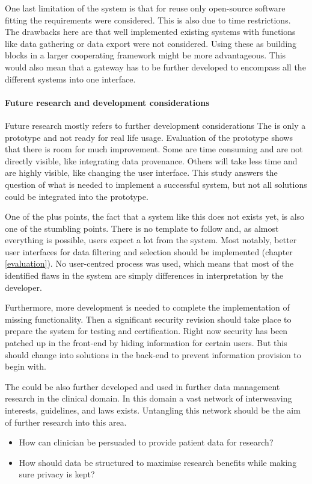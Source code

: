 One last limitation of the system is that for reuse only open-source software fitting the requirements were considered.
This is also due to time restrictions.
The drawbacks here are that well implemented existing systems with functions like data gathering or data export were not considered.
Using these as building blocks in a larger cooperating framework might be more advantageous.
This would also mean that a gateway has to be further developed to encompass all the different systems into one interface.

\paragraph{Future research and development considerations}
Future research mostly refers to further development considerations
The \ivfsystem{} is only a prototype and not ready for real life usage.
Evaluation of the prototype shows that there is room for much improvement.
Some are time consuming and are not directly visible, like integrating data provenance.
Others will take less time and are highly visible, like changing the user interface.
This study answers the question of what is needed to implement a successful system, but not all solutions could be integrated into the prototype.

One of the plus points, the fact that a system like this does not exists yet, is also one of the stumbling points.
There is no template to follow and, as almost everything is possible, users expect a lot from the system.
Most notably, better user interfaces for data filtering and selection should be implemented (chapter \ref{evaluation}).
No user-centred process was used, which means that most of the identified flaws in the system are simply differences in interpretation by the developer.

Furthermore, more development is needed to complete the implementation of missing functionality.
Then a significant security revision should take place to prepare the system for testing and certification.
Right now security has been patched up in the front-end by hiding information for certain users. 
But this should change into solutions in the back-end to prevent information provision to begin with.

The \ivfsystem{} could be also further developed and used in further data management research in the clinical domain.
In this domain a vast network of interweaving interests, guidelines, and laws exists.
Untangling this network should be the aim of further research into this area.
\begin{itemize}
	\item How can clinician be persuaded to provide patient data for research?
	\item How should data be structured to maximise research benefits while making sure privacy is kept?
\end{itemize}

